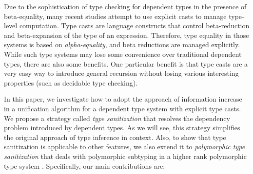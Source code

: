 Due to the sophistication of type checking for dependent types in the
presence of beta-equality, many recent
studies \citep{van2013explicit, kimmell2012equational, sjoberg2012irrelevance,
  sjoberg2015programming, stump2009verified, sulzmann2007system,
  yang2016unified} attempt to use explicit casts to manage type-level
computation. Type casts are language constructs that control beta-reduction and
beta-expansion of the type of an expression. Therefore, type equality
in those systems is based
on \emph{alpha-equality}, and beta reductions are managed
explicitly. While such type systems may lose some convenience over 
traditional dependent types, there are also some benefits. 
One particular benefit is that type casts 
are a very easy way to introduce general recursion without losing 
various interesting properties (such as decidable type checking).

In this paper, we investigate how to adopt the approach of information increase
in a unification algorithm for a dependent type system with
explicit type casts. We propose a strategy called \textit{type sanitization} that
resolves the dependency problem introduced by dependent types. As we will see,
this strategy simplifies the original approach of type inference in context.
Also, to show that type sanitization is applicable to other features, we also
extend it to \textit{polymorphic type sanitization} that deals with polymorphic
subtyping in a higher rank polymorphic type system \citep{dunfield2013complete}.
Specifically, our main contributions are:

